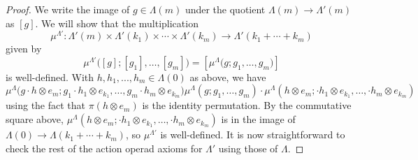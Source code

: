 \documentclass{amsbook} %
\numberwithin{section}{chapter}
\begin{document}
\begin{proof}
We write the image of $g \in \Lambda(m)$ under the quotient $\Lambda(m) \to \Lambda'(m)$ as $[g]$. We will show that the multiplication
\[
\mu^{\Lambda'}:\Lambda'(m) \times \Lambda'(k_1) \times \cdots \times \Lambda'(k_m) \to \Lambda'(k_1 + \cdots + k_m)
\]
given by 
\[
\mu^{\Lambda'}\Big( [g]; [g_1], \ldots , [g_m] \Big) = [\mu^{\Lambda}\Big(g; g_1, \ldots, g_m \Big)]
\]
is well-defined. With $h, h_1, ..., h_m \in \Lambda(0)$ as above, we have
\[
\mu^{\Lambda}\Big(g \cdot h \otimes e_m; g_1\cdot h_1 \otimes e_{k_1}, \ldots, g_m\cdot h_m \otimes e_{k_m} \Big) \mu^{\Lambda}(g; g_1, \ldots, g_m) \cdot \mu^{\Lambda}(h \otimes e_m; \cdot h_1 \otimes e_{k_1}, \ldots, \cdot h_m \otimes e_{k_m})
\]
using the fact that $\pi(h \otimes e_m)$ is the identity permutation. By the commutative square above, $\mu^{\Lambda}(h \otimes e_m; \cdot h_1 \otimes e_{k_1}, \ldots, \cdot h_m \otimes e_{k_m})$ is in the image of $\Lambda(0) \to \Lambda(k_1 + \cdots + k_m)$, so $\mu^{\Lambda'}$ is well-defined. It is now straightforward to check the rest of the action operad axioms for $\Lambda'$ using those of $\Lambda$.






\end{proof}
\end{document}
